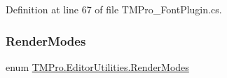 Definition at line 67 of file T\+M\+Pro\+\_\+\+Font\+Plugin.\+cs.

\mbox{\label{namespace_t_m_pro_1_1_editor_utilities_ac956f92fd288b0b627522e75a9c5b9ad}} 
\subsubsection{\texorpdfstring{RenderModes}{RenderModes}}
{\footnotesize\ttfamily enum \mbox{\hyperlink{namespace_t_m_pro_1_1_editor_utilities_ac956f92fd288b0b627522e75a9c5b9ad}{T\+M\+Pro.\+Editor\+Utilities.\+Render\+Modes}}\hspace{0.3cm}{\ttfamily [strong]}}

